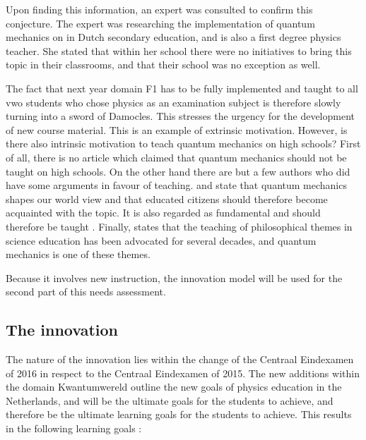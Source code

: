 \documentclass[11pt,twoside]{report} %
\begin{document}
Upon finding this information, an expert was consulted to confirm this conjecture. The expert was researching the implementation of quantum mechanics on in Dutch secondary education, and is also a first degree physics teacher. She stated that within her school there were no initiatives to bring this topic in their classrooms, and that their school was no exception as well.

The fact that next year domain F1 has to be fully implemented and taught to all vwo students who chose physics as an examination subject is therefore slowly turning into a sword of Damocles. This stresses the urgency for the development of new course material. This is an example of extrinsic motivation. However, is there also intrinsic motivation to teach quantum mechanics on high schools? First of all, there is no article which claimed that quantum mechanics should not be taught on high schools. On the other hand there are but a few authors who did have some arguments in favour of teaching.  and  state that quantum mechanics shapes our world view and that educated citizens should therefore become acquainted with the topic. It is also regarded as fundamental and should therefore be taught \cite{henriksen,hobson}. Finally,  states that the teaching of philosophical themes in science education has been advocated for several decades, and quantum mechanics is one of these themes.

Because it involves new instruction, the innovation model will be used for the second part of this needs assessment.

\subsection{The innovation}
\label{subsec:needsassessmentinnovation}

The nature of the innovation lies within the change of the Centraal Eindexamen of 2016 in respect to the Centraal Eindexamen of 2015. The new additions within the domain Kwantumwereld outline the new goals of physics education in the Netherlands, and will be the ultimate goals for the students to achieve, and therefore be the ultimate learning goals for the students to achieve. This results in the following learning goals \cite[p. 24-25]{eindexamen2016}:
\end{document}
